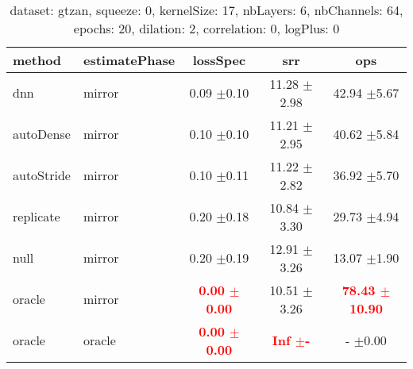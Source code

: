   
\begin{table} 
\begin{center} 
\ 
 \setlength{\tabcolsep}{.16667em} 
\begin{tabular}{llccc} 
method & estimatePhase & lossSpec & srr & ops \\ 
\hline 
dnn & mirror & 0.09 $\pm$0.10 & 11.28 $\pm$2.98 &  42.94 $\pm$5.67 \\ 
autoDense & mirror & 0.10 $\pm$0.10 & 11.21 $\pm$2.95 &  40.62 $\pm$5.84 \\ 
autoStride & mirror & 0.10 $\pm$0.11 & 11.22 $\pm$2.82 &  36.92 $\pm$5.70 \\ 
replicate & mirror & 0.20 $\pm$0.18 & 10.84 $\pm$3.30 &  29.73 $\pm$4.94 \\ 
null & mirror & 0.20 $\pm$0.19 & 12.91 $\pm$3.26 &  13.07 $\pm$1.90 \\ 
oracle & mirror & \textbf{\textcolor{red}{0.00 $\pm$0.00}} & 10.51 $\pm$3.26 & \textbf{\textcolor{red}{78.43 $\pm$10.90}} \\ 
oracle & oracle & \textbf{\textcolor{red}{0.00 $\pm$0.00}} & \textbf{\textcolor{red}{   Inf $\pm$-}} &    - $\pm$0.00 \\ 
\end{tabular} 
\end{center} 
\caption{dataset: gtzan, squeeze: 0, kernelSize: 17, nbLayers: 6, nbChannels: 64, epochs: 20, dilation: 2, correlation: 0, logPlus: 0} 
\label{dagtSq0Kesi17Nbla6Nbch64Ep20Di2Co0Lopl0} 
\end{table} 
 

